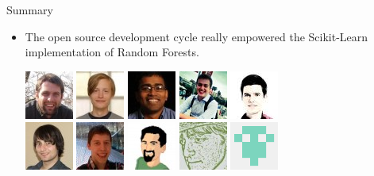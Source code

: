 \documentclass{beamer}
\begin{document}
\begin{frame}{Summary}

\begin{itemize}

\item The open source development cycle really empowered the Scikit-Learn implementation of Random Forests.

\begin{center}
\includegraphics[scale=0.5]{./figures/avatars/bholt.jpg}\quad
\includegraphics[scale=0.5]{./figures/avatars/pprett.jpg}\quad
\includegraphics[scale=0.5]{./figures/avatars/satra.jpg}\quad
\includegraphics[scale=0.5]{./figures/avatars/glouppe.jpg}\quad
\includegraphics[scale=0.5]{./figures/avatars/ndawe.jpg}\\
\includegraphics[scale=0.5]{./figures/avatars/amueller.jpg}\quad
\includegraphics[scale=0.5]{./figures/avatars/arjoly.jpg}\quad
\includegraphics[scale=0.5]{./figures/avatars/ogrisel.jpg}\quad
\includegraphics[scale=0.5]{./figures/avatars/joel.jpg}\quad
\includegraphics[scale=0.666]{./figures/avatars/lars.png}
\end{center}


\end{itemize}
\end{frame}
\end{document}

